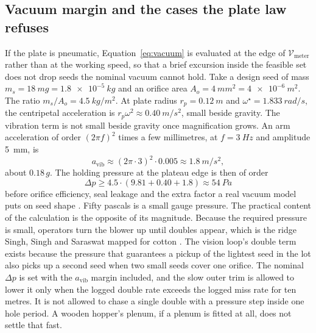 \subsection{Vacuum margin and the cases the plate law refuses}

If the plate is pneumatic, Equation~\eqref{eq:vacuum} is evaluated at the edge of \(\mathcal{V}_{\mathrm{meter}}\) rather than at the working speed, so that a brief excursion inside the feasible set does not drop seeds the nominal vacuum cannot hold. Take a design seed of mass \(m_s=\SI{18}{mg}=\SI{1.8e-5}{kg}\) and an orifice area \(A_o=\SI{4}{mm^2}=\SI{4e-6}{m^2}\). The ratio \(m_s/A_o=\SI{4.5}{kg/m^2}\). At plate radius \(r_p=\SI{0.12}{m}\) and \(\omega^{\star}=\SI{1.833}{rad/s}\), the centripetal acceleration is \(r_p\omega^2\approx\SI{0.40}{m/s^2}\), small beside gravity. The vibration term is not small beside gravity once magnification grows. An arm acceleration of order \((2\pi f)^2\) times a few millimetres, at \(f=\SI{3}{Hz}\) and amplitude \SI{5}{mm}, is
\begin{equation}
\label{eq:avib}
a_{\mathrm{vib}} \approx (2\pi\cdot 3)^2 \cdot 0.005 \approx \SI{1.8}{m/s^2},
\end{equation}
about \(0.18\,g\). The holding pressure at the plateau edge is then of order
\begin{equation}
\label{eq:dpnum}
\Delta p \ge 4.5 \cdot (9.81 + 0.40 + 1.8) \approx \SI{54}{Pa}
\end{equation}
before orifice efficiency, seal leakage and the extra factor a real vacuum model puts on seed shape \cite{karayel2004}. Fifty pascals is a small gauge pressure. The practical content of the calculation is the opposite of its magnitude. Because the required pressure is small, operators turn the blower up until doubles appear, which is the ridge Singh, Singh and Saraswat mapped for cotton \cite{singh2005}. The vision loop's double term exists because the pressure that guarantees a pickup of the lightest seed in the lot also picks up a second seed when two small seeds cover one orifice. The nominal \(\Delta p\) is set with the \(a_{\mathrm{vib}}\) margin included, and the slow outer trim is allowed to lower it only when the logged double rate exceeds the logged miss rate for ten metres. It is not allowed to chase a single double with a pressure step inside one hole period. A wooden hopper's plenum, if a plenum is fitted at all, does not settle that fast.

